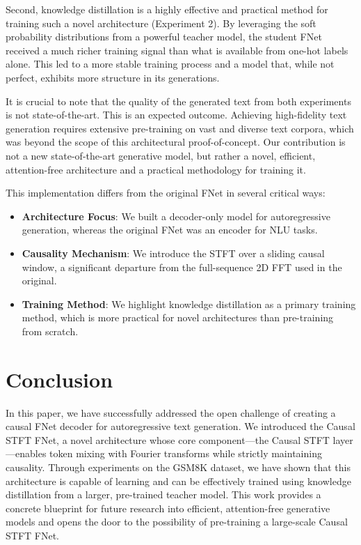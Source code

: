 \documentclass[11pt,a4paper]{article}
\begin{document}
Second, knowledge distillation is a highly effective and practical method for training such a novel architecture (Experiment 2). By leveraging the soft probability distributions from a powerful teacher model, the student FNet received a much richer training signal than what is available from one-hot labels alone. This led to a more stable training process and a model that, while not perfect, exhibits more structure in its generations.

It is crucial to note that the quality of the generated text from both experiments is not state-of-the-art. This is an expected outcome. Achieving high-fidelity text generation requires extensive pre-training on vast and diverse text corpora, which was beyond the scope of this architectural proof-of-concept. Our contribution is not a new state-of-the-art generative model, but rather a novel, efficient, attention-free architecture and a practical methodology for training it.

This implementation differs from the original FNet in several critical ways:
\begin{itemize}
    \item \textbf{Architecture Focus}: We built a decoder-only model for autoregressive generation, whereas the original FNet was an encoder for NLU tasks.
    \item \textbf{Causality Mechanism}: We introduce the STFT over a sliding causal window, a significant departure from the full-sequence 2D FFT used in the original.
    \item \textbf{Training Method}: We highlight knowledge distillation as a primary training method, which is more practical for novel architectures than pre-training from scratch.
\end{itemize}


\section{Conclusion}
In this paper, we have successfully addressed the open challenge of creating a causal FNet decoder for autoregressive text generation. We introduced the Causal STFT FNet, a novel architecture whose core component—the Causal STFT layer—enables token mixing with Fourier transforms while strictly maintaining causality. Through experiments on the GSM8K dataset, we have shown that this architecture is capable of learning and can be effectively trained using knowledge distillation from a larger, pre-trained teacher model. This work provides a concrete blueprint for future research into efficient, attention-free generative models and opens the door to the possibility of pre-training a large-scale Causal STFT FNet.
\end{document}
